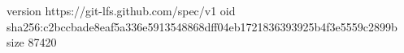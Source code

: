 version https://git-lfs.github.com/spec/v1
oid sha256:c2bccbade8eaf5a336e5913548868dff04eb1721836393925b4f3e5559c2899b
size 87420

